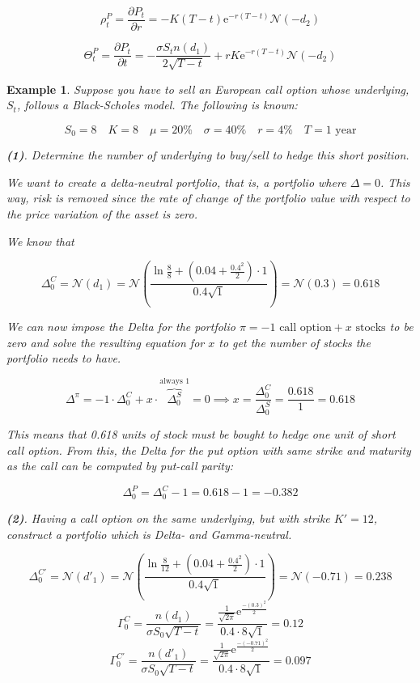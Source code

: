 \documentclass[oneside,titlepage,headinclude,12pt,a4paper,BCOR5mm,footinclude]{book}
\theoremstyle{defn}
\newtheorem{example}{Example}
\newcommand{\eexp}{\mathrm{e}}
\newcommand\NN{\mathcal{N}}
\newcommand\de\partial
\begin{document}
\[
  \rho^P_t = \frac{\de P_t}{\de r} = -K(T-t)\eexp^{-r(T-t)} \NN(-d_2)
\]

\[
  \Theta^P_t = \frac{\de P_t}{\de t} = -\frac{\sigma S_t n(d_1)}{2\sqrt{T-t}} + rK\eexp^{-r(T-t)}\NN(-d_2)
\]

\begin{example}
  Suppose you  have to  sell an  European call  option whose  underlying, $S_t$,
  follows a Black-Scholes model. The following is known:

  \[
    S_0 = 8 \quad K = 8 \quad \mu = 20\% \quad \sigma = 40\% \quad r = 4\% \quad T = 1 \text{\ year}
  \]

  \textbf{(1)}. Determine  the number  of underlying to  buy/sell to  hedge this
  short position.

  We want  to create  a \textit{delta-neutral portfolio},  that is,  a portfolio
  where $\Delta = 0$. This way, risk is  removed since the rate of change of the
  portfolio value with respect to the price variation of the asset is zero.

  We know that 
  
  \[
    \Delta_0^C = \NN(d_1) = \NN\left(\frac{\ln\frac{8}{8} + \left(0.04 + \frac{0.4^2}{2}\right) \cdot 1}{0.4\sqrt{1}}\right)
    = \NN(0.3) = 0.618
  \]

  We can now impose the Delta for the portfolio $\pi = -1 \text{\ call option} +
  x \text{ stocks}$ to  be zero and solve the resulting equation  for $x$ to get
  the number of stocks the portfolio needs to have.

  \[
    \Delta^\pi = -1\cdot\Delta_0^C + x\cdot\overbrace{\Delta_0^{S}}^{\text{always }1} = 0 \implies
    x = \frac{\Delta^C_0}{\Delta^S_0} = \frac{0.618}{1} = 0.618
  \]

  This means that 0.618 units of stock must be bought to hedge one unit of short
  call option.  From this,  the Delta for  the put option  with same  strike and
  maturity as the call can be computed by put-call parity:

  \[
    \Delta_0^P = \Delta_0^C - 1 = 0.618 - 1 = -0.382
  \]

  \textbf{(2)}. Having a call option on the same underlying, but with strike $K'
  = 12$, construct a portfolio which is Delta- and Gamma-neutral.

  \[
    \Delta_0^{C'} = \NN(d'_1) = \NN\left(
      \frac{\ln\frac{8}{12} + \left(0.04+\frac{0.4^2}{2}\right)\cdot 1}{0.4\sqrt{1}}
    \right) = \NN(-0.71) = 0.238
  \]
  \[
    \Gamma_0^{C} = \frac{n(d_1)}{\sigma S_0\sqrt{T-t}} = 
    \frac{\frac{1}{\sqrt{2\pi}} \eexp^\frac{-(0.3)^2}{2}}{0.4 \cdot 8 \sqrt{1}} = 0.12
  \]
  \[
    \Gamma_0^{C'} = \frac{n(d'_1)}{\sigma S_0\sqrt{T-t}} = 
    \frac{\frac{1}{\sqrt{2\pi}} \eexp^\frac{-(-0.71)^2}{2}}{0.4 \cdot 8 \sqrt{1}} = 0.097
  \]


\end{example}
\end{document}
